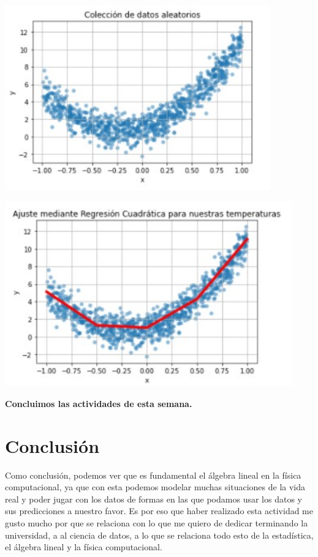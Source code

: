 \documentclass[12pt]{article}
\begin{document}
    \begin{center}
	\includegraphics[height=8cm]{E6.3.jpeg}\\
    \end{center}
    
    \begin{center}
	\includegraphics[height=8cm]{E6.4.jpeg}\\
    \end{center}
    
\textbf{Concluimos las actividades de esta semana.}
    



\section{Conclusión}

Como conclusión, podemos ver que es fundamental el álgebra lineal en la física computacional, ya que con esta podemos modelar muchas situaciones de la vida real y poder jugar con los datos de formas en las que podamos usar los datos y sus predicciones a nuestro favor. Es por eso que haber realizado esta actividad me gusto mucho por que se relaciona con lo que me quiero de dedicar terminando la universidad, a al ciencia de datos, a lo que se relaciona todo esto de la estadística, el álgebra lineal y la física computacional. 
\end{document}
